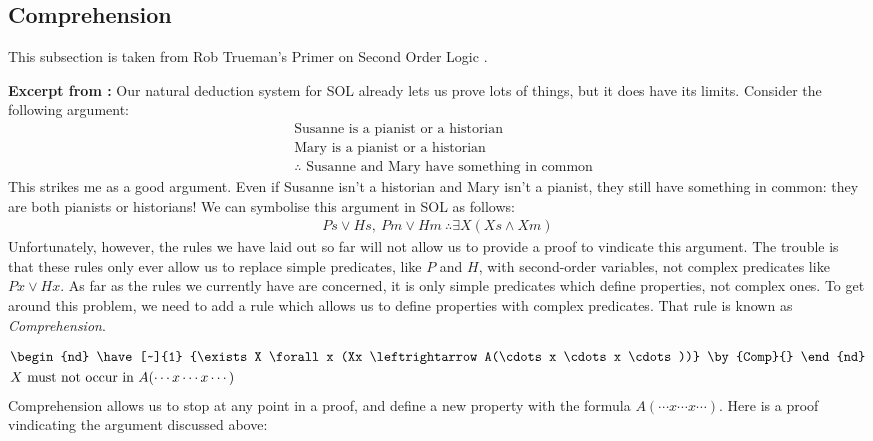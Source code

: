 \subsection{Comprehension}
This subsection is taken from Rob Trueman's Primer on Second Order Logic \cite{truemanSOL}.
\begin{tcolorbox}
    \textbf{Excerpt from \cite{truemanSOL}:} Our natural deduction system for SOL already lets us prove lots of things, but it does have its limits. Consider the following argument: 
    \begin{align*}
        &\text{Susanne is a pianist or a historian}\\
        &\text{Mary is a pianist or a historian}\\
        &\therefore \text{ Susanne and Mary have something in common} 
    \end{align*}
This strikes me as a good argument. Even if Susanne isn’t a historian and Mary isn’t a pianist, they still have something in common: they are both pianists or historians! We can symbolise this argument in SOL as follows:
\begin{align*}
    Ps \vee Hs, \ Pm \vee Hm \ \therefore \exists X(Xs \wedge Xm)
\end{align*}
Unfortunately, however, the rules we have laid out so far will not allow us to provide a proof to vindicate this argument. 
The trouble is that these rules only ever allow us to replace simple predicates, like $P$ and $H$, with second-order variables, 
not complex predicates like $Px \vee Hx$. As far as the rules we currently have are concerned, it is only simple predicates which 
define properties, not complex ones. To get around this problem, we need to add a rule which allows us to define properties 
with complex predicates. That rule is known as \textit{Comprehension}.
\end{tcolorbox}
\begin{align}
    &\begin{nd}
        \have[~]{1} {\exists X \forall x (Xx \leftrightarrow A(\cdots x \cdots x \cdots))} \by{Comp}{} 
    \end{nd}\nonumber \\
    &X \text{ must not occur in }A(\cdots x \cdots x \cdots) \nonumber 
\end{align} 
Comprehension allows us to stop at any point in a proof, and define a new property with the formula $A(\cdots x \cdots x \cdots)$. Here is a proof vindicating the argument discussed above:
